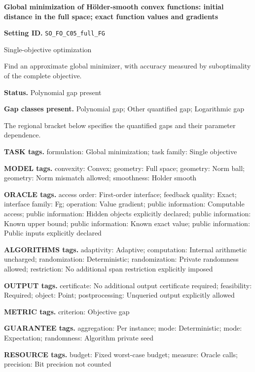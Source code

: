 \documentclass[10pt,a4paper]{article}
\begin{document}
\raggedright

{\LARGE\bfseries\sffamily\color{AtlasNavy} Global minimization of Hölder-smooth convex functions: initial distance in the full space; exact function values and gradients\par}\vspace{5pt}
\textbf{Setting ID.} \texttt{SO\_\allowbreak{}FO\_\allowbreak{}C05\_\allowbreak{}full\_\allowbreak{}FG}

Single-objective optimization

Find an approximate global minimizer, with accuracy measured by suboptimality of the complete objective.

\textbf{Status.} Polynomial gap present

\textbf{Gap classes present.} Polynomial gap; Other quantified gap; Logarithmic gap

The regional bracket below specifies the quantified gaps and their parameter dependence.

\textbf{TASK tags.} formulation: Global minimization; task family: Single objective

\textbf{MODEL tags.} convexity: Convex; geometry: Full space; geometry: Norm ball; geometry: Norm mismatch allowed; smoothness: Holder smooth

\textbf{ORACLE tags.} access order: First-order interface; feedback quality: Exact; interface family: Fg; operation: Value gradient; public information: Computable access; public information: Hidden objects explicitly declared; public information: Known upper bound; public information: Known exact value; public information: Public inputs explicitly declared

\textbf{ALGORITHMS tags.} adaptivity: Adaptive; computation: Internal arithmetic uncharged; randomization: Deterministic; randomization: Private randomness allowed; restriction: No additional span restriction explicitly imposed

\textbf{OUTPUT tags.} certificate: No additional output certificate required; feasibility: Required; object: Point; postprocessing: Unqueried output explicitly allowed

\textbf{METRIC tags.} criterion: Objective gap

\textbf{GUARANTEE tags.} aggregation: Per instance; mode: Deterministic; mode: Expectation; randomness: Algorithm private seed

\textbf{RESOURCE tags.} budget: Fixed worst-case budget; measure: Oracle calls; precision: Bit precision not counted
\end{document}
